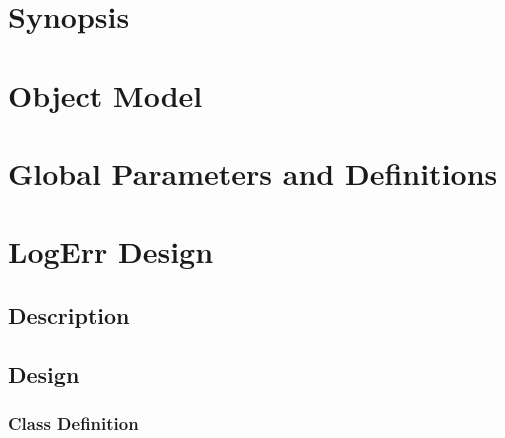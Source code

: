 \documentclass[]{article}
\begin{document}




\newpage
\tableofcontents

\newpage


\section{Synopsis}





%


\section{Object Model}




\section{Global Parameters and Definitions}





\section{LogErr Design}

\subsection{Description}




\subsection{Design}




\subsubsection{Class Definition}


\end{document}
